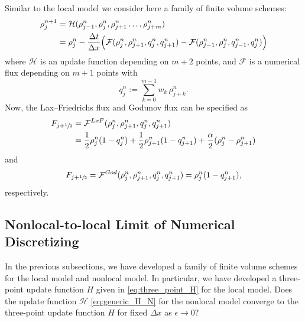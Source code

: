 Similar to the local model we consider here a family of finite volume schemes: \\
\begin{equation}\label{eq:generic_H_N}
    \begin{split}
        \rho_{j}^{n+1} & = \mathcal{H}(\rho_{j-1}^{n},\rho_{j}^{n},\rho_{j+1}^{n}\dots,\rho_{j+m}^{n})                                                                                                          \\
                       & = \rho_{j}^{n} - \frac{\Delta t}{\Delta x} \Bigl(\mathcal{F}(\rho_{j}^{n},\rho_{j+1}^{n},q_{j}^{n},q_{j+1}^{n}) - \mathcal{F}(\rho_{j-1}^{n},\rho_{j}^{n},q_{j-1}^{n},q_{j}^{n})\Bigr)
    \end{split}
\end{equation}
where $\mathcal{H}$ is an update function depending on $m+2$ points, and $\mathcal{F}$ is a numerical flux depending on $m+1$ points with
\[
    q_{j}^{n}:= \sum_{k=0}^{m-1} w_k \, \rho_{j+k}^{n}.
\]
Now, the Lax--Friedrichs flux and Godunov flux can be specified as
\begin{equation}\label{eq:Lax-F numerical flux}
    \begin{split}
        F_{j+\sfrac{1}{2}} & = \mathcal{F}^{LxF}(\rho_{j}^{n},\rho_{j+1}^{n},q_{j}^{n},q_{j+1}^{n})                                                                 \\
                           & =\frac{1}{2}\rho_{j}^{n}(1- q_{j}^{n}) + \frac{1}{2}\rho_{j+1}^{n} (1- q_{j+1}^{n}) + \frac{\alpha}{2} (\rho_{j}^{n} - \rho_{j+1}^{n})
    \end{split}
\end{equation}
and
\begin{equation}\label{eq:Godunov numerical flux}
    \begin{split}
        F_{j+\sfrac{1}{2}}  = \mathcal{F}^{God}(\rho_{j}^{n},\rho_{j+1}^{n},q_{j}^{n},q_{j+1}^{n}) = \rho_{j}^{n} (1- q_{j+1}^{n}),
    \end{split}
\end{equation}
respectively.
\subsection{Nonlocal-to-local Limit of Numerical Discretizing}
In the previous subsections, we have developed a family of finite volume schemes for the local model and nonlocal model. In particular, we have developed a three-point update function $H$ given in \eqref{eq:three_point_H} for the local model. Does the update function $\mathcal{H}$ \eqref{eq:generic_H_N} for the nonlocal model converge to the three-point update function $H$ for fixed $\Delta x$ as $\epsilon \rightarrow 0$?


